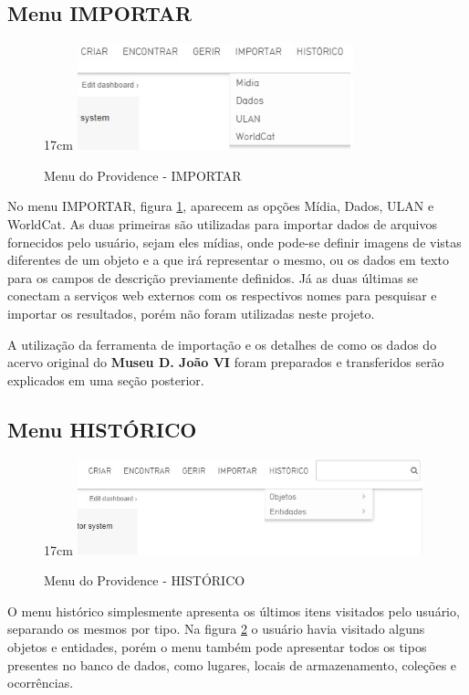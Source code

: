 \documentclass[a4paper,12pt,oneside,onecolumn,final,fleqn]{repUERJ}
\begin{document}
\subsection{Menu IMPORTAR}

\begin{figure}[!ht]{17cm}
	\includegraphics[width=8cm, center]{figuras/menu_importar.jpg}
	\caption{Menu do Providence - IMPORTAR} \label{fig:menu_importar}
\end{figure}

No menu IMPORTAR, figura \ref{fig:menu_importar}, aparecem as opções Mídia, Dados, ULAN e WorldCat. As duas primeiras são utilizadas para importar dados de arquivos fornecidos pelo usuário, sejam eles mídias, onde pode-se definir imagens de vistas diferentes de um objeto e a que irá representar o mesmo, ou os dados em texto para os campos de descrição previamente definidos. Já as duas últimas se conectam a serviços web externos com os respectivos nomes para pesquisar e importar os resultados, porém não foram utilizadas neste projeto.

A utilização da ferramenta de importação e os detalhes de como os dados do acervo original do \textbf{Museu D. João VI} foram preparados e transferidos serão explicados em uma seção posterior.

\subsection{Menu HISTÓRICO}

\begin{figure}[!ht]{17cm}
	\includegraphics[width=10cm, center]{figuras/menu_hist.jpg}
	\caption{Menu do Providence - HISTÓRICO} \label{fig:menu_hist}
\end{figure}

O menu histórico simplesmente apresenta os últimos itens visitados pelo usuário, separando os mesmos por tipo. Na figura \ref{fig:menu_hist} o usuário havia visitado alguns objetos e entidades, porém o menu também pode apresentar todos os tipos presentes no banco de dados, como lugares, locais de armazenamento, coleções e ocorrências.
\end{document}
